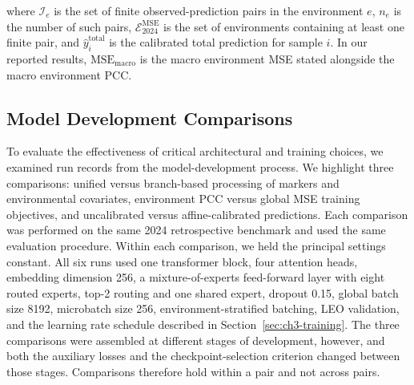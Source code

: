 where $\mathcal{I}_e$ is the set of finite observed-prediction pairs in the environment $e$, $n_e$ is the number of such pairs, $\mathcal{E}^{\mathrm{MSE}}_{2024}$ is the set of environments containing at least one finite pair, and $\hat{y}^{\mathrm{total}}_i$ is the calibrated total prediction for sample $i$. In our reported results, $\mathrm{MSE}_{\mathrm{macro}}$ is the macro environment MSE stated alongside the macro environment PCC.

\subsection{Model Development Comparisons}\label{sec:ch3-comparisons}
To evaluate the effectiveness of critical architectural and training choices, we examined run records from the model-development process. We highlight three comparisons: unified versus branch-based processing of markers and environmental covariates, environment PCC versus global MSE training objectives, and uncalibrated versus affine-calibrated predictions. Each comparison was performed on the same 2024 retrospective benchmark and used the same evaluation procedure. Within each comparison, we held the principal settings constant. All six runs used one transformer block, four attention heads, embedding dimension 256, a mixture-of-experts feed-forward layer with eight routed experts, top-2 routing and one shared expert, dropout 0.15, global batch size 8192, microbatch size 256, environment-stratified batching, LEO validation, and the learning rate schedule described in Section~\ref{sec:ch3-training}. The three comparisons were assembled at different stages of development, however, and both the auxiliary losses and the checkpoint-selection criterion changed between those stages. Comparisons therefore hold within a pair and not across pairs.

